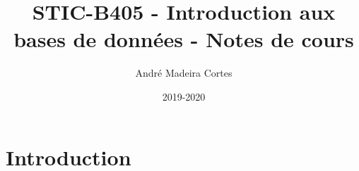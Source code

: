 \documentclass{article}
\title{STIC-B405 - Introduction aux bases de données - Notes de cours}
\author{André Madeira Cortes}
\date{2019-2020}
\begin{document}
\maketitle

\section{Introduction}
\end{document}
